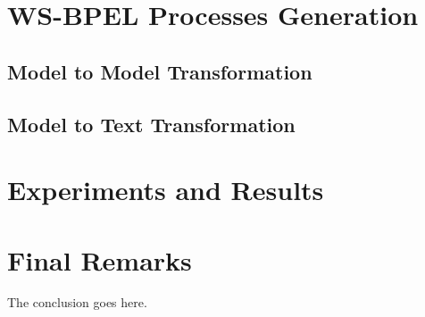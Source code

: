 \documentclass[conference]{IEEEtran}
\begin{document}
 
\section{WS-BPEL Processes Generation}

\subsection{Model to Model Transformation}

\subsection{Model to Text Transformation}

\section{Experiments and Results}


\section{Final Remarks}
The conclusion goes here.






% 
% 







%
%
%




 
% 
% 




\end{document}
